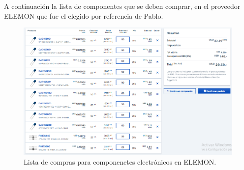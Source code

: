 A continuación la lista de componentes que se deben comprar, en el proveedor ELEMON que fue el elegido por referencia de Pablo. %

\begin{figure}[!ht]
	\centering
	\includegraphics[width=\linewidth]{"Figures/21_04_2025/Lista de compras ELEMON"}
	\caption{Lista de compras para componenetes electrónicos en ELEMON.}
	\label{fig:lista-de-compras-elemon}
\end{figure}


